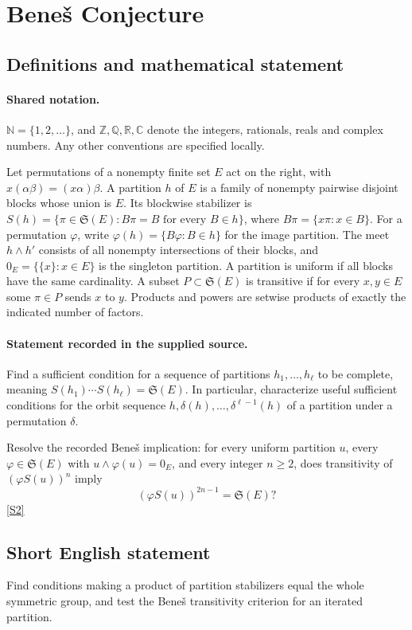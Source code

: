 \documentclass[11pt]{article}
\newcommand{\sref}[2]{\hyperlink{source:#1:#2}{[S#2]}}
\begin{document}
\section{Beneš Conjecture}\label{statement}

\subsection{Definitions and mathematical statement}

\paragraph{Shared notation.}$\mathbb N=\{1,2,\ldots\}$, and $\mathbb Z,\mathbb Q,\mathbb R,\mathbb C$ denote the integers, rationals, reals and complex numbers. Any other conventions are specified locally.


Let permutations of a nonempty finite set $E$ act on the right, with $x(\alpha\beta)=(x\alpha)\beta$. A partition $h$ of $E$ is a family of nonempty pairwise disjoint blocks whose union is $E$. Its blockwise stabilizer is
$S(h)=\{\pi\in\mathfrak S(E):B\pi=B\text{ for every }B\in h\}$, where $B\pi=\{x\pi:x\in B\}$.
For a permutation $\varphi$, write $\varphi(h)=\{B\varphi:B\in h\}$ for the image partition. The meet $h\wedge h'$ consists of all nonempty intersections of their blocks, and $0_E=\{\{x\}:x\in E\}$ is the singleton partition. A partition is uniform if all blocks have the same cardinality. A subset $P\subset\mathfrak S(E)$ is transitive if for every $x,y\in E$ some $\pi\in P$ sends $x$ to $y$. Products and powers are setwise products of exactly the indicated number of factors.
\paragraph{Statement recorded in the supplied source.}
Find a sufficient condition for a sequence of partitions $h_1,\ldots,h_\ell$ to be complete, meaning $S(h_1)\cdots S(h_\ell)=\mathfrak S(E)$. In particular, characterize useful sufficient conditions for the orbit sequence $h,\delta(h),\ldots,\delta^{\ell-1}(h)$ of a partition under a permutation $\delta$.

Resolve the recorded Beneš implication: for every uniform partition $u$, every $\varphi\in\mathfrak S(E)$ with $u\wedge\varphi(u)=0_E$, and every integer $n\geq2$, does transitivity of $(\varphi S(u))^n$ imply
\[
 (\varphi S(u))^{2n-1}=\mathfrak S(E)?
\] \sref{statement}{2}
\subsection{Short English statement}
Find conditions making a product of partition stabilizers equal the whole symmetric group, and test the Beneš transitivity criterion for an iterated partition.
\end{document}
